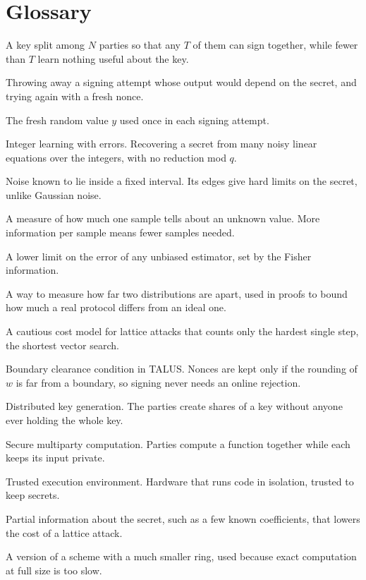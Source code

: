 \documentclass[10pt,conference,a4paper]{IEEEtran}
\begin{document}
\section{Glossary}\label{app:glossary}
\begin{list}{}{\setlength{\leftmargin}{1em}\setlength{\itemindent}{-1em}\setlength{\labelwidth}{0pt}%
  \setlength{\labelsep}{0.4em}\setlength{\itemsep}{1pt}\setlength{\parsep}{0pt}\renewcommand{\makelabel}[1]{\textbf{##1}}}
\item[Threshold signature.] A key split among $N$ parties so that any $T$ of them can sign together, while fewer than $T$
learn nothing useful about the key.
\item[Rejection sampling.] Throwing away a signing attempt whose output would depend on the secret, and trying again with
a fresh nonce.
\item[Nonce.] The fresh random value $y$ used once in each signing attempt.
\item[ILWE.] Integer learning with errors. Recovering a secret from many noisy linear equations over the integers, with no
reduction mod $q$.
\item[Bounded noise.] Noise known to lie inside a fixed interval. Its edges give hard limits on the secret, unlike Gaussian
noise.
\item[Fisher information.] A measure of how much one sample tells about an unknown value. More information per sample means
fewer samples needed.
\item[Cram\'er--Rao bound.] A lower limit on the error of any unbiased estimator, set by the Fisher information.
\item[R\'enyi divergence.] A way to measure how far two distributions are apart, used in proofs to bound how much a real
protocol differs from an ideal one.
\item[Core-SVP.] A cautious cost model for lattice attacks that counts only the hardest single step, the shortest vector
search.
\item[BCC.] Boundary clearance condition in TALUS. Nonces are kept only if the rounding of $w$ is far from a boundary, so
signing never needs an online rejection.
\item[DKG.] Distributed key generation. The parties create shares of a key without anyone ever holding the whole key.
\item[MPC.] Secure multiparty computation. Parties compute a function together while each keeps its input private.
\item[TEE.] Trusted execution environment. Hardware that runs code in isolation, trusted to keep secrets.
\item[Hint (lattice).] Partial information about the secret, such as a few known coefficients, that lowers the cost of a
lattice attack.
\item[Toy size.] A version of a scheme with a much smaller ring, used because exact computation at full size is too slow.
\end{list}
\end{document}

